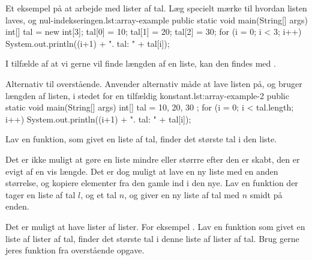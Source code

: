     \begin{JavaCode}{Et eksempel på at arbejde med lister af tal. Læg specielt mærke til hvordan listen laves, og nul-indekseringen.}{lst:array-example}
        public static void main(String[] args) {
            int[] tal = new int[3];
            tal[0] = 10;
            tal[1] = 20;
            tal[2] = 30;
            for (i = 0; i < 3; i++) {
                System.out.println((i+1) + ". tal: "
                                         + tal[i]);
            }
        }
    \end{JavaCode}

    I tilfælde af at vi gerne vil finde længden af en liste, kan den findes med
    .

    \begin{JavaCode}{Alternativ til overstående. Anvender alternativ måde at lave listen på, og bruger længden af listen, i stedet for en tilfældig konstant.}{lst:array-example-2}
        public static void main(String[] args) {
            int[] tal = { 10, 20, 30 };
            for (i = 0; i < tal.length; i++) {
                System.out.println((i+1) + ". tal: "
                                         + tal[i]);
            }
        }
    \end{JavaCode}


	\begin{exercise}
		Lav en funktion, som givet en liste af tal, finder det største tal i den
		liste.
	\end{exercise}

    \begin{exercise}
        Det er ikke muligt at gøre en liste mindre eller størrre efter
        den er skabt, den er evigt af en vis længde.  Det er dog
        muligt at lave en ny liste med en anden størrelse, og kopiere
        elementer fra den gamle ind i den nye.
        Lav en funktion  der tager en liste af tal
        \(l\), og et tal \(n\), og giver en ny liste af tal med \(n\)
        smidt på enden.
    \end{exercise}

    \begin{exercise}
        Det er muligt at have lister af lister. For eksempel
        .  Lav en funktion som givet en liste af
        lister af tal, finder det største tal i denne liste af lister
        af tal. Brug gerne jeres funktion fra overstående opgave.
    \end{exercise}

